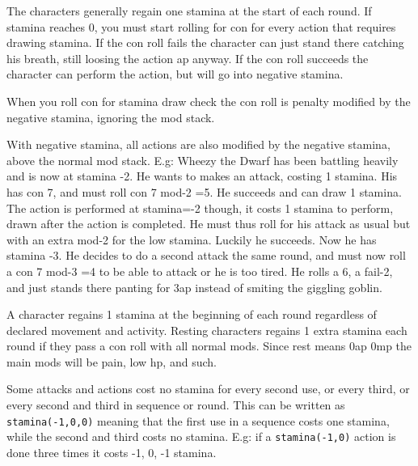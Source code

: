 The characters generally regain one stamina at the start of each round. If stamina reaches 0, you must start rolling for con for every action that requires drawing stamina. If the con roll fails the character can just stand there catching his breath, still loosing the action ap anyway. If the con roll succeeds the character can perform the action, but will go into negative stamina.

When you roll con for stamina draw check the con roll is penalty modified by the negative stamina, ignoring the mod stack.

With negative stamina, all actions are also modified by the negative stamina, above the normal mod stack.
E.g: Wheezy the Dwarf has been battling heavily and is now at stamina -2. He wants to makes an attack, costing 1 stamina. His has con 7, and must roll con 7 mod-2 =5. He succeeds and can draw 1 stamina. The action is performed at stamina=-2 though, it costs 1 stamina to perform, drawn after the action is completed. He must thus roll for his attack as usual but with an extra mod-2 for the low stamina. Luckily he succeeds. Now he has stamina -3. He decides to do a second attack the same round, and must now roll a con 7 mod-3 =4 to be able to attack or he is too tired. He rolls a 6, a fail-2, and just stands there panting for 3ap instead of smiting the giggling goblin.

A character regains 1 stamina at the beginning of each round regardless of declared movement and activity. Resting characters regains 1 extra stamina each round if they pass a con roll with all normal mods. Since rest means 0ap 0mp the main mods will be pain, low hp, and such. 

Some attacks and actions cost no stamina for every second use, or every third, or every second and third in sequence or round. This can be written as \verb|stamina(-1,0,0)| meaning that the first use in a sequence costs one stamina, while the second and third costs no stamina. E.g: if a \verb|stamina(-1,0)| action is done three times it costs -1, 0, -1 stamina.














